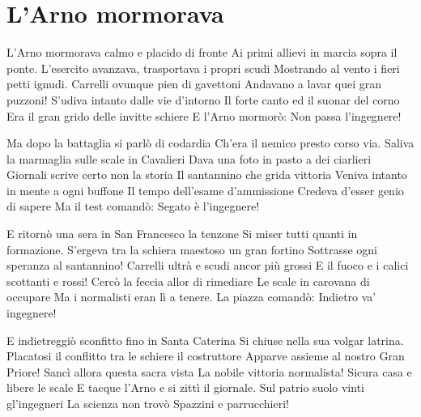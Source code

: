 \section{L'Arno mormorava}
\subtitle{Sulla melodia de “La canzone del Piave“}
\begin{canzone}
L'Arno mormorava calmo e placido di fronte
Ai primi allievi in marcia sopra il ponte.
L'esercito avanzava, trasportava i propri scudi
Mostrando al vento i fieri petti ignudi.
Carrelli ovunque pien di gavettoni
Andavano a lavar quei gran puzzoni!
S'udiva intanto dalle vie d'intorno
Il forte canto ed il suonar del corno
Era il gran grido delle invitte schiere
E l'Arno mormorò:
Non passa l'ingegnere!

Ma dopo la battaglia si parlò di codardia
Ch'era il nemico presto corso via.
Saliva la marmaglia sulle scale in Cavalieri
Dava una foto in pasto a dei ciarlieri
Giornali scrive certo non la storia
Il santannino che grida vittoria
Veniva intanto in mente a ogni buffone
Il tempo dell'esame d'ammissione
Credeva d'esser genio di sapere
Ma il test comandò:
Segato è l'ingegnere!

E ritornò una sera in San Francesco la tenzone
Si miser tutti quanti in formazione.
S'ergeva tra la schiera maestoso un gran fortino
Sottrasse ogni speranza al santannino!
Carrelli ultrà e scudi ancor più grossi
E il fuoco e i calici scottanti e rossi!
Cercò la feccia allor di rimediare
Le scale in carovana di occupare
Ma i normalisti eran lì a tenere.
La piazza comandò:
Indietro va' ingegnere!

E indietreggiò sconfitto fino in Santa Caterina
Si chiuse nella sua volgar latrina.
Placatosi il conflitto tra le schiere il costruttore
Apparve assieme al nostro Gran Priore!
Sancì allora questa sacra vista
La nobile vittoria normalista!
Sicura casa e libere le scale
E tacque l'Arno e si zittì il giornale.
Sul patrio suolo vinti gl'ingegneri
La scienza non trovò
Spazzini e parrucchieri!
\end{canzone}
